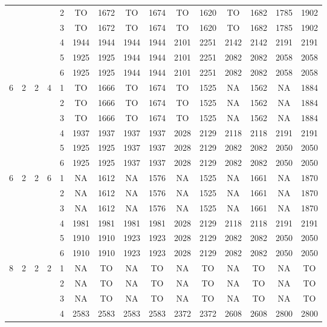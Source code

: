\begin{longtable}{|c|c|c|c|c|c c|c c|c c|c c|c c|}
 & & & & 2 & TO & 1672 & TO & 1674 & TO & 1620 & TO & 1682 & 1785 & 1902 \\
 & & & & 3 & TO & 1672 & TO & 1674 & TO & 1620 & TO & 1682 & 1785 & 1902 \\
 & & & & 4 & 1944 & 1944 & 1944 & 1944 & 2101 & 2251 & 2142 & 2142 & 2191 & 2191 \\
 & & & & 5 & 1925 & 1925 & 1944 & 1944 & 2101 & 2251 & 2082 & 2082 & 2058 & 2058 \\
 & & & & 6 & 1925 & 1925 & 1944 & 1944 & 2101 & 2251 & 2082 & 2082 & 2058 & 2058 \\
\hline
\multirow{6}{*}{6} & \multirow{6}{*}{2} & \multirow{6}{*}{2} & \multirow{6}{*}{4} & 1 & TO & 1666 & TO & 1674 & TO & 1525 & NA & 1562 & NA & 1884 \\
 & & & & 2 & TO & 1666 & TO & 1674 & TO & 1525 & NA & 1562 & NA & 1884 \\
 & & & & 3 & TO & 1666 & TO & 1674 & TO & 1525 & NA & 1562 & NA & 1884 \\
 & & & & 4 & 1937 & 1937 & 1937 & 1937 & 2028 & 2129 & 2118 & 2118 & 2191 & 2191 \\
 & & & & 5 & 1925 & 1925 & 1937 & 1937 & 2028 & 2129 & 2082 & 2082 & 2050 & 2050 \\
 & & & & 6 & 1925 & 1925 & 1937 & 1937 & 2028 & 2129 & 2082 & 2082 & 2050 & 2050 \\
\hline
\multirow{6}{*}{6} & \multirow{6}{*}{2} & \multirow{6}{*}{2} & \multirow{6}{*}{6} & 1 & NA & 1612 & NA & 1576 & NA & 1525 & NA & 1661 & NA & 1870 \\
 & & & & 2 & NA & 1612 & NA & 1576 & NA & 1525 & NA & 1661 & NA & 1870 \\
 & & & & 3 & NA & 1612 & NA & 1576 & NA & 1525 & NA & 1661 & NA & 1870 \\
 & & & & 4 & 1981 & 1981 & 1981 & 1981 & 2028 & 2129 & 2118 & 2118 & 2191 & 2191 \\
 & & & & 5 & 1910 & 1910 & 1923 & 1923 & 2028 & 2129 & 2082 & 2082 & 2050 & 2050 \\
 & & & & 6 & 1910 & 1910 & 1923 & 1923 & 2028 & 2129 & 2082 & 2082 & 2050 & 2050 \\
\hline
\multirow{6}{*}{8} & \multirow{6}{*}{2} & \multirow{6}{*}{2} & \multirow{6}{*}{2} & 1 & NA & TO & NA & TO & NA & TO & NA & TO & NA & TO \\
 & & & & 2 & NA & TO & NA & TO & NA & TO & NA & TO & NA & TO \\
 & & & & 3 & NA & TO & NA & TO & NA & TO & NA & TO & NA & TO \\
 & & & & 4 & 2583 & 2583 & 2583 & 2583 & 2372 & 2372 & 2608 & 2608 & 2800 & 2800 \\

\end{longtable}
